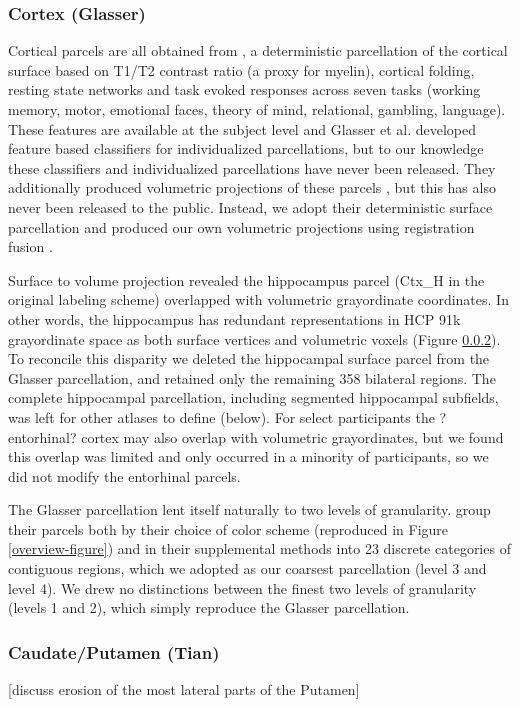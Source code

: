 \documentclass[10pt,letterpaper]{article}
\begin{document}
\subsubsection{Cortex (Glasser)} Cortical parcels are all obtained from , a deterministic parcellation of the cortical surface based on T1/T2 contrast ratio (a proxy for myelin), cortical folding, resting state networks and task evoked responses across seven tasks (working memory, motor, emotional faces, theory of mind, relational, gambling, language). These features are available at the subject level and Glasser et al. developed feature based classifiers for individualized parcellations, but to our knowledge these classifiers and individualized parcellations have never been released. They additionally produced volumetric projections of these parcels , but this has also never been released to the public. Instead, we adopt their deterministic surface parcellation and produced our own volumetric projections using registration fusion . 



Surface to volume projection revealed the hippocampus parcel (Ctx\_H in the original labeling scheme) overlapped with volumetric grayordinate coordinates. In other words, the hippocampus has redundant representations in HCP 91k grayordinate space as both surface vertices and volumetric voxels (Figure \ref{}). To reconcile this disparity we deleted the hippocampal surface parcel from the Glasser parcellation, and retained only the remaining 358 bilateral regions. The complete hippocampal parcellation, including segmented hippocampal subfields, was left for other atlases to define (below). For select participants the ?entorhinal? cortex may also overlap with volumetric grayordinates, but we found this overlap was limited and only occurred in a minority of participants, so we did not modify the entorhinal parcels.

The Glasser parcellation lent itself naturally to two levels of granularity.  group their parcels both by their choice of color scheme (reproduced in Figure \ref{overview-figure}) and in their supplemental methods into 23 discrete categories of contiguous regions, which we adopted as our coarsest parcellation (level 3 and level 4). We drew no distinctions between the finest two levels of granularity (levels 1 and 2), which simply reproduce the Glasser parcellation.

\subsubsection{Caudate/Putamen (Tian)} [discuss erosion of the most lateral parts of the Putamen]
\\
\end{document}
